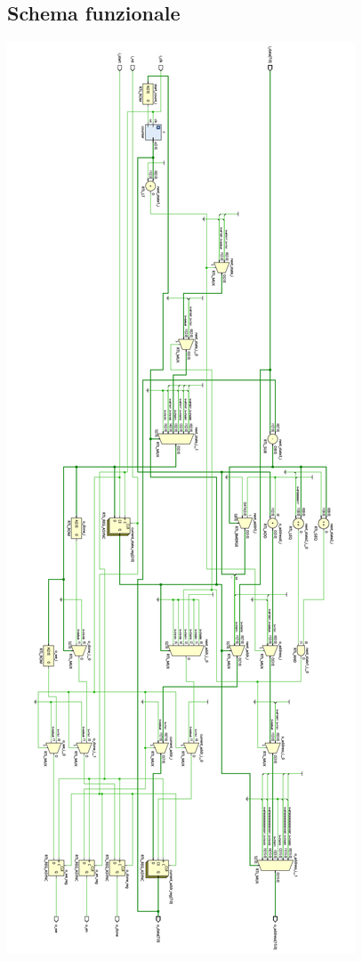 \documentclass{article}
\begin{document}
\subsection{Schema funzionale}
\includegraphics[height=0.92\textheight]{schematic.png}
\end{document}
